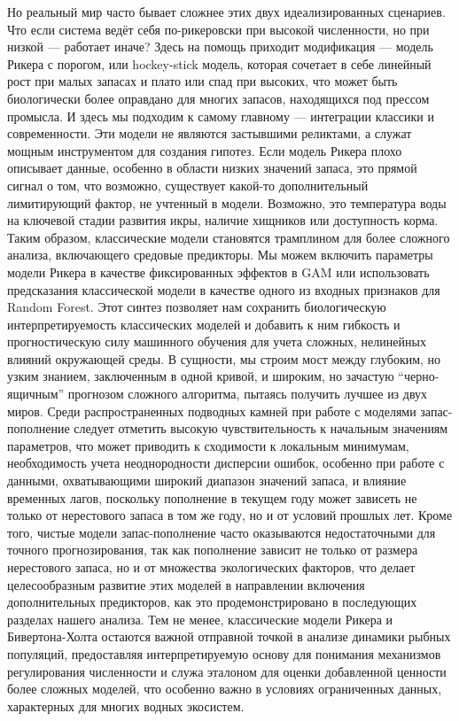 \documentclass[
  letterpaper,
  DIV=11,
  numbers=noendperiod]{scrreprt}
\begin{document}
Но реальный мир часто бывает сложнее этих двух идеализированных
сценариев. Что если система ведёт себя по-рикеровски при высокой
численности, но при низкой --- работает иначе? Здесь на помощь приходит
модификация --- модель Рикера с порогом, или hockey-stick модель,
которая сочетает в себе линейный рост при малых запасах и плато или спад
при высоких, что может быть биологически более оправдано для многих
запасов, находящихся под прессом промысла. И здесь мы подходим к самому
главному --- интеграции классики и современности. Эти модели не являются
застывшими реликтами, а служат мощным инструментом для создания гипотез.
Если модель Рикера плохо описывает данные, особенно в области низких
значений запаса, это прямой сигнал о том, что возможно, существует
какой-то дополнительный лимитирующий фактор, не учтенный в модели.
Возможно, это температура воды на ключевой стадии развития икры, наличие
хищников или доступность корма. Таким образом, классические модели
становятся трамплином для более сложного анализа, включающего средовые
предикторы. Мы можем включить параметры модели Рикера в качестве
фиксированных эффектов в GAM или использовать предсказания классической
модели в качестве одного из входных признаков для Random Forest. Этот
синтез позволяет нам сохранить биологическую интерпретируемость
классических моделей и добавить к ним гибкость и прогностическую силу
машинного обучения для учета сложных, нелинейных влияний окружающей
среды. В сущности, мы строим мост между глубоким, но узким знанием,
заключенным в одной кривой, и широким, но зачастую ``черно-ящичным''
прогнозом сложного алгоритма, пытаясь получить лучшее из двух миров.
Среди распространенных подводных камней при работе с моделями
запас-пополнение следует отметить высокую чувствительность к начальным
значениям параметров, что может приводить к сходимости к локальным
минимумам, необходимость учета неоднородности дисперсии ошибок, особенно
при работе с данными, охватывающими широкий диапазон значений запаса, и
влияние временных лагов, поскольку пополнение в текущем году может
зависеть не только от нерестового запаса в том же году, но и от условий
прошлых лет. Кроме того, чистые модели запас-пополнение часто
оказываются недостаточными для точного прогнозирования, так как
пополнение зависит не только от размера нерестового запаса, но и от
множества экологических факторов, что делает целесообразным развитие
этих моделей в направлении включения дополнительных предикторов, как это
продемонстрировано в последующих разделах нашего анализа. Тем не менее,
классические модели Рикера и Бивертона-Холта остаются важной отправной
точкой в анализе динамики рыбных популяций, предоставляя
интерпретируемую основу для понимания механизмов регулирования
численности и служа эталоном для оценки добавленной ценности более
сложных моделей, что особенно важно в условиях ограниченных данных,
характерных для многих водных экосистем.
\end{document}
